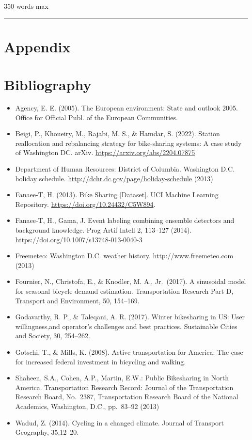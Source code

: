 \documentclass[
  10pt,
]{article}
\providecommand{\tightlist}{%
  \setlength{\itemsep}{0pt}\setlength{\parskip}{0pt}}
\begin{document}
350 words max

\begin{center}\rule{0.5\linewidth}{0.5pt}\end{center}

\section{Appendix}\label{appendix}

\section{Bibliography}\label{bibliography}

\begin{itemize}
\tightlist
\item
  Agency, E. E. (2005). The European environment: State and outlook
  2005. Office for Official Publ. of the European Communities.
\item
  Beigi, P., Khoueiry, M., Rajabi, M. S., \& Hamdar, S. (2022). Station
  reallocation and rebalancing strategy for bike-sharing systems: A case
  study of Washington DC. arXiv. \url{https://arxiv.org/abs/2204.07875}
\item
  Department of Human Resources: District of Columbia. Washington D.C.
  holiday schedule. \url{http://dchr.dc.gov/page/holiday-schedule}
  (2013)
\item
  Fanaee-T, H. (2013). Bike Sharing {[}Dataset{]}. UCI Machine Learning
  Repository. \url{https://doi.org/10.24432/C5W894}.
\item
  Fanaee-T, H., Gama, J. Event labeling combining ensemble detectors and
  background knowledge. Prog Artif Intell 2, 113--127 (2014).
  \url{https://doi.org/10.1007/s13748-013-0040-3}
\item
  Freemeteo: Washington D.C. weather history.
  \url{http://www.freemeteo.com} (2013)
\item
  Fournier, N., Christofa, E., \& Knodler, M. A., Jr.~(2017). A
  sinusoidal model for seasonal bicycle demand estimation.
  Transportation Research Part D, Transport and Environment, 50,
  154--169.
\item
  Godavarthy, R. P., \& Taleqani, A. R. (2017). Winter bikesharing in
  US: User willingness,and operator's challenges and best practices.
  Sustainable Cities and Society, 30, 254--262.
\item
  Gotschi, T., \& Mills, K. (2008). Active transportation for America:
  The case for increased federal investment in bicycling and walking.
\item
  Shaheen, S.A., Cohen, A.P., Martin, E.W.: Public Bikesharing in North
  America. Transportation Research Record: Journal of the Transportation
  Research Board, No.~2387, Transportation Research Board of the
  National Academics, Washington, D.C., pp.~83--92 (2013)
\item
  Wadud, Z. (2014). Cycling in a changed climate. Journal of Transport
  Geography, 35,12--20.
\end{itemize}
\end{document}
